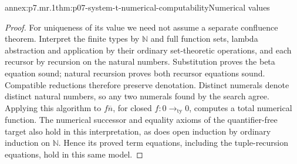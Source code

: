 \begin{annexitem}{annex:p7.mr.1}{thm:p07-system-t-numerical-computability}{Numerical values}
\begin{proof}
For uniqueness of its value we need not assume a separate confluence
theorem. Interpret the finite types by \(\mathbb N\) and full
function sets, lambda abstraction and application by their ordinary
set-theoretic operations, and each recursor by recursion on the
natural numbers. Substitution proves the beta equation sound; natural
recursion proves both recursor equations sound. Compatible reductions
therefore preserve denotation. Distinct numerals denote distinct
natural numbers, so any two numerals found by the search agree.
Applying this algorithm to \(f\overline n\), for closed
\(f:0\to_{\mathrm{ty}}0\), computes a total numerical function.
The numerical successor and equality axioms of the quantifier-free
target also hold in this interpretation, as does open induction by
ordinary induction on \(\mathbb N\). Hence its proved term equations,
including the tuple-recursion equations, hold in this same model.
\end{proof}
\end{annexitem}

